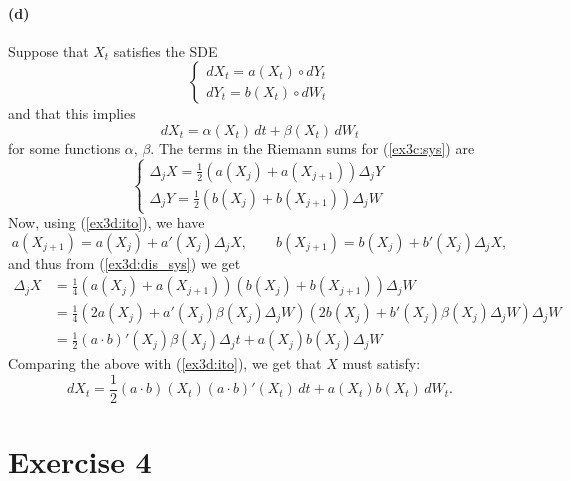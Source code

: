 \documentclass[a4paper,11pt]{article}
\theoremstyle{definition}
\theoremstyle{plain}
\theoremstyle{remark}
\begin{document}
\paragraph*{(d)}

Suppose that $X_t$ satisfies the SDE 
\begin{equation}
\begin{cases} dX_t = a(X_t)\circ dY_t \\ dY_t = b(X_t)\circ dW_t \end{cases}
\label{ex3d:sys}
\end{equation}
and that this implies
\begin{equation} 
\label{ex3d:ito}
dX_t = \alpha(X_t)\,dt + \beta(X_t)\,dW_t
\end{equation}
for some functions $\alpha$, $\beta$.
The terms in the Riemann sums for (\ref{ex3c:sys}) are
\begin{equation}
\begin{cases} \Delta_j X  = \frac{1}{2}(a(X_j)+a(X_{j+1}))\Delta_j Y \\  \Delta_j Y = \frac{1}{2}(b(X_j)+b(X_{j+1}))\Delta_j W \end{cases} \label{ex3d:dis_sys}
\end{equation}
Now, using (\ref{ex3d:ito}), we have
$$
a(X_{j+1}) = a(X_j) + a'(X_j)\Delta_j X, \qquad b(X_{j+1}) = b(X_j) + b'(X_j)\Delta_j X ,
$$
and thus from (\ref{ex3d:dis_sys}) we get
\begin{align*}
\Delta_j X & = \frac{1}{4}(a(X_j)+a(X_{j+1}))(b(X_j)+b(X_{j+1}))\Delta_jW \\ & = \frac{1}{4}(2a(X_j)+a'(X_j)\beta(X_j)\Delta_jW)(2b(X_j)+b'(X_j)\beta(X_j)\Delta_jW)\Delta_jW \\ & = \frac{1}{2}(a\cdot b)'(X_j)\beta(X_j)\Delta_jt + a(X_j)b(X_j)\Delta_jW
\end{align*}
Comparing the above with (\ref{ex3d:ito}), we get that $X$ must satisfy:
$$
dX_t = \frac{1}{2}(a\cdot b)(X_t)(a\cdot b)'(X_t)\,dt + a(X_t)b(X_t)\,dW_t.
$$

\section*{Exercise 4}
\end{document}
